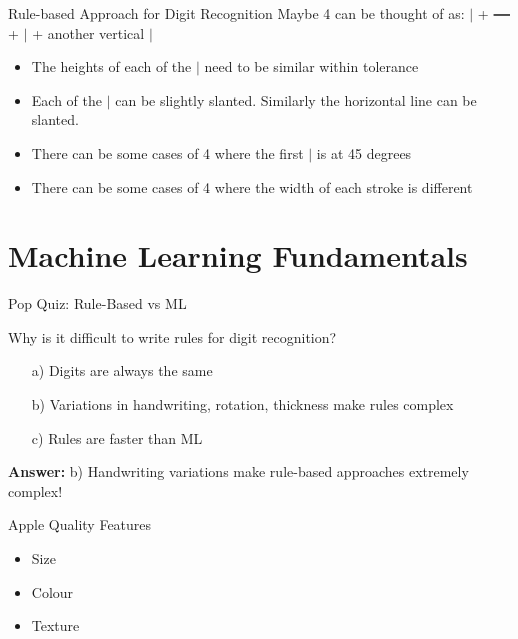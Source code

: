 \documentclass[dvipsnames]{beamer}
\begin{document}
\begin{frame}{Rule-based Approach for Digit Recognition}
Maybe 4 can be thought of as: $\bm{|}$ + $\bm{\rule[0.5ex]{1em}{.95pt}}$ + $\bm{|}$ + another vertical $\bm{|}$

\begin{itemize}
	\item \pause The heights of each of the $\bm{|}$ need to be similar within tolerance
	
	\item \pause Each of the $\bm{|}$ can be slightly slanted. Similarly the horizontal line can be slanted.
	\item \pause There can be some cases of 4 where the first $\bm{|}$ is at 45 degrees
	\item \pause There can be some cases of 4 where the width of each stroke is different
	
\end{itemize}

\end{frame}	

\section{Machine Learning Fundamentals}

\begin{frame}{Pop Quiz: Rule-Based vs ML}
\begin{popquizbox}{1}
Why is it difficult to write rules for digit recognition?
\begin{enumerate}
\item[a)] Digits are always the same
\item[b)] Variations in handwriting, rotation, thickness make rules complex
\item[c)] Rules are faster than ML
\end{enumerate}

\vspace{0.5em}
\textbf{Answer:} b) Handwriting variations make rule-based approaches extremely complex!
\end{popquizbox}
\end{frame}

\begin{frame}{Apple Quality Features}
\begin{itemize}
	\item Size
	\item \pause Colour
	\item \pause Texture
\end{itemize}
\end{frame}
  
\end{document}
